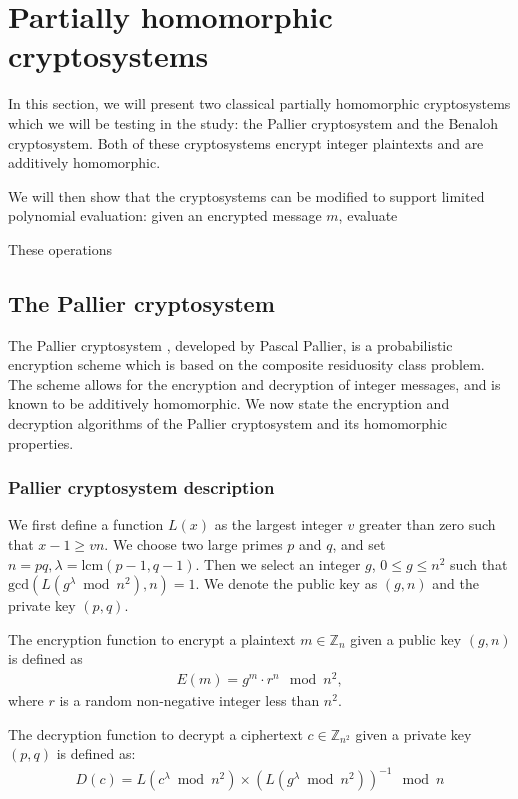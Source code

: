 \section{Partially homomorphic cryptosystems}

In this section, we will present two classical partially homomorphic cryptosystems which we will be testing in the study: the Pallier cryptosystem and the Benaloh cryptosystem. Both of these cryptosystems encrypt integer plaintexts and are additively homomorphic.

We will then show that the cryptosystems can be modified to support limited polynomial evaluation: given an encrypted message $m$, evaluate

These operations
\subsection{The Pallier cryptosystem}
The Pallier cryptosystem \cite{stern_public-key_1999}, developed by Pascal Pallier, is a probabilistic encryption scheme which is based on the composite residuosity class problem. The scheme allows for the encryption and decryption of integer messages, and is known to be additively homomorphic. We now state the encryption and decryption algorithms of the Pallier cryptosystem and its homomorphic properties.

\subsubsection{Pallier cryptosystem description}
We first define a function $L(x)$ as the largest integer $v$ greater than zero such that $x-1 \geq vn$.
We choose two large primes $p$ and $q$, and set $n = pq, \lambda = \mathrm{lcm}(p-1,q-1)$.
Then we select an integer $g$, $0\leq g \leq n^2$ such that $\mathrm{gcd}(L(g^\lambda \bmod n^2), n) = 1$.
We denote the public key as $(g,n)$ and the private key $(p,q)$.

The encryption function to encrypt a plaintext $m \in \mathbb{Z}_n$ given a public key $(g,n)$ is defined as
\begin{align*}
  E(m) = g^m \cdot r^n \mod{n^2},
\end{align*}
where $r$ is a random non-negative integer less than $n^2$.

The decryption function to decrypt a ciphertext $c \in \mathbb{Z}_{n^2}$ given a private key $(p,q)$ is defined as:
\begin{align*}
  D(c) = L(c^\lambda \bmod n^2) \times (L(g^\lambda \bmod n^2))^{-1} \mod n
\end{align*}

